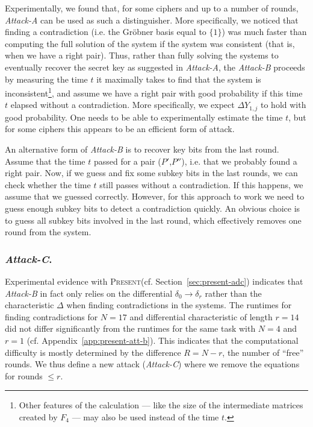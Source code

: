 \documentclass{llncs}
\newcommand{\PRESENT}{\textsc{Present}\xspace}
\begin{document}
Experimentally, we found that, for some ciphers and up to a number of rounds, 
\emph{Attack-A} can be used as such a distinguisher. More specifically, we
noticed that finding a contradiction (i.e. the Gr\"obner basis equal to $\{1\}$)
was much faster than computing the full solution of the system if the system was
consistent (that is, when we have a right pair). 
Thus, rather than fully solving the systems to eventually recover the secret key
as suggested in \emph{Attack-A}, the \emph{Attack-B} proceeds by measuring the
time $t$ it maximally takes to find that the system is inconsistent\footnote{
Other features of the calculation
--- like the size of the intermediate matrices created by $F_4$ --- may also be
used instead of the time $t$.}, and assume
we have a right pair with good probability if this time $t$ elapsed
without a contradiction. More specifically, we expect $\Delta Y_{1,j}$ to
hold with good probability. One needs to be able to experimentally estimate the
time $t$, but for some ciphers this appears to be an efficient form of attack.

An alternative form of \emph{Attack-B} is to recover key bits from the last
round. Assume that the time $t$ passed for a pair ($P'$,$P''$), i.e. that we
probably found a right pair. Now, if we guess and fix some subkey bits in the
last rounds, we can check whether the time $t$ still passes without a
contradiction. If this happens, we assume that we guessed correctly. However,
for this approach to work we need to guess enough subkey bits to detect a
contradiction quickly. An obvious choice is to guess all subkey bits involved
in the last round, which effectively removes one round from the system.

\subsubsection{\emph{Attack-C}.}

Experimental evidence with \PRESENT (cf. Section~\ref{sec:present-adc})
indicates that \emph{Attack-B} in fact only relies on the differential $\delta_0
\rightarrow \delta_r$ rather than the characteristic $\Delta$ when finding
contradictions in the systems. The runtimes for finding contradictions
for $N=17$ and differential characteristic of length $r=14$ did
not differ significantly from the runtimes for the same task with $N=4$
and $r=1$ (cf. Appendix~\ref{app:present-att-b}).
This indicates that the computational difficulty is mostly determined by the
difference $R = N-r$, the number of ``free'' rounds. We thus define a new
attack (\emph{Attack-C}) where we remove the equations for rounds $\leq
r$. 
\end{document}
